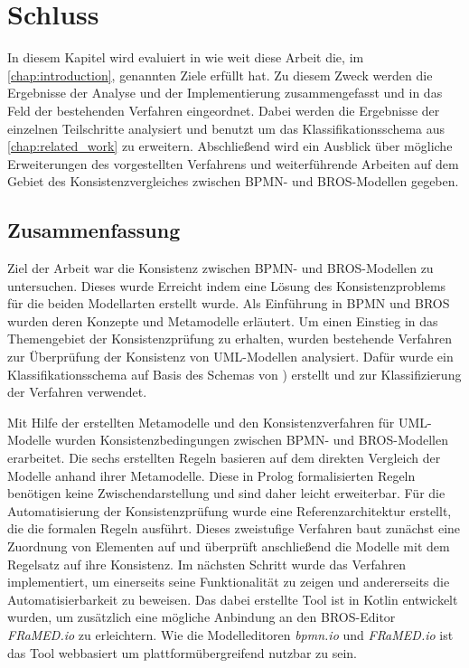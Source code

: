 \chapter{Schluss}
\label{chap:conclusion}

In diesem Kapitel wird evaluiert in wie weit diese Arbeit die, im \cref{chap:introduction}, genannten Ziele erfüllt hat.
Zu diesem Zweck werden die Ergebnisse der Analyse und der Implementierung zusammengefasst und in das Feld der bestehenden Verfahren eingeordnet.
Dabei werden die Ergebnisse der einzelnen Teilschritte analysiert und benutzt um das Klassifikationsschema aus \cref{chap:related_work} zu erweitern.
Abschließend wird ein Ausblick über mögliche Erweiterungen des vorgestellten Verfahrens und weiterführende Arbeiten auf dem Gebiet des Konsistenzvergleiches zwischen BPMN- und BROS-Modellen gegeben.

\section{Zusammenfassung}

Ziel der Arbeit war die Konsistenz zwischen BPMN- und BROS-Modellen zu untersuchen.
Dieses wurde Erreicht indem eine Lösung des Konsistenzproblems für die beiden Modellarten erstellt wurde.
Als Einführung in BPMN und BROS wurden deren Konzepte und Metamodelle erläutert.
Um einen Einstieg in das Themengebiet der Konsistenzprüfung zu erhalten, wurden bestehende Verfahren zur Überprüfung der Konsistenz von UML-Modellen analysiert.
Dafür wurde ein Klassifikationsschema auf Basis des Schemas von \cite{Usman2008}) erstellt und zur Klassifizierung der Verfahren verwendet.

Mit Hilfe der erstellten Metamodelle und den Konsistenzverfahren für UML-Modelle wurden Konsistenzbedingungen zwischen BPMN- und BROS-Modellen erarbeitet.
Die sechs erstellten Regeln basieren auf dem direkten Vergleich der Modelle anhand ihrer Metamodelle.
Diese in Prolog formalisierten Regeln benötigen keine Zwischendarstellung und sind daher leicht erweiterbar.
Für die Automatisierung der Konsistenzprüfung wurde eine Referenzarchitektur erstellt, die die formalen Regeln ausführt.
Dieses zweistufige Verfahren baut zunächst eine Zuordnung von Elementen auf und überprüft anschließend die Modelle mit dem Regelsatz auf ihre Konsistenz.
Im nächsten Schritt wurde das Verfahren implementiert, um einerseits seine Funktionalität zu zeigen und andererseits die Automatisierbarkeit zu beweisen.
Das dabei erstellte Tool ist in Kotlin entwickelt wurden, um zusätzlich eine mögliche Anbindung an den BROS-Editor \emph{FRaMED.io} zu erleichtern.
Wie die Modelleditoren \emph{bpmn.io} und \emph{FRaMED.io} ist das Tool webbasiert um plattformübergreifend nutzbar zu sein.

